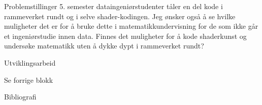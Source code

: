\documentclass[]{beamer}
\begin{document}
\begin{frame}[t]
\begin{columns}
\begin{column}{0.33\textwidth}
\begin{block}{Problemstillinger}
            5. semester dataingeniørstudenter tåler en del kode i rammeverket rundt og i selve shader-kodingen. Jeg ønsker også å se hvilke muligheter det er for å bruke
            dette i matematikkundervisning for de som ikke går et ingeniørstudie innen data. Finnes det muligheter for å kode shaderkunst og undersøke matematikk uten å dykke dypt i rammeverket rundt?
         \end{block}
         \begin{block}{Utviklingsarbeid}
            
            Se forrige blokk
            \color{NTNUgrey}
            \lipsum[2]
         \end{block}

         \begin{block}{Bibliografi}
            \printbibliography[heading=none]
         \end{block}
      \end{column}
      
   \end{columns}
\end{frame}
\end{document}
